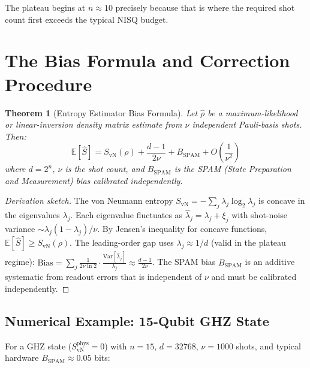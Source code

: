 \documentclass[12pt,letterpaper]{article}
\theoremstyle{plain}
\newtheorem{theorem}{Theorem}[section]
\theoremstyle{definition}
\theoremstyle{remark}
\newcommand{\SvN}{S_{\mathrm{vN}}}
\newcommand{\Shat}{\hat{S}}
\newcommand{\bias}{B_{\mathrm{SPAM}}}
\begin{document}
The plateau begins at $n \approx 10$ precisely because that is where the
required shot count first exceeds the typical NISQ budget.

\section{The Bias Formula and Correction Procedure}
\label{sec:bias}

\begin{theorem}[Entropy Estimator Bias Formula]
\label{thm:bias}
Let $\hat\rho$ be a maximum-likelihood or linear-inversion density matrix
estimate from $\nu$ independent Pauli-basis shots. Then:
\begin{equation}
  \mathbb{E}[\Shat] = \SvN(\rho)
  + \frac{d-1}{2\nu}
  + \bias
  + O\!\left(\frac{1}{\nu^2}\right)
  \tag{B3.1}
  \label{eq:bias_formula}
\end{equation}
where $d = 2^n$, $\nu$ is the shot count, and $\bias$ is the
SPAM (State Preparation and Measurement) bias calibrated independently.
\end{theorem}

\begin{proof}[Derivation sketch]
The von Neumann entropy $\SvN = -\sum_j\lambda_j\log_2\lambda_j$ is
concave in the eigenvalues $\lambda_j$. Each eigenvalue fluctuates as
$\hat\lambda_j = \lambda_j + \xi_j$ with shot-noise variance
$\sim\lambda_j(1-\lambda_j)/\nu$. By Jensen's inequality for concave
functions, $\mathbb{E}[\Shat] \geq \SvN(\rho)$. The leading-order gap
uses $\lambda_j \approx 1/d$ (valid in the plateau regime):
$\mathrm{Bias} = \sum_j\frac{1}{2\nu\ln 2}\cdot
\frac{\mathrm{Var}[\hat\lambda_j]}{\lambda_j}
\approx \frac{d-1}{2\nu}$.
The SPAM bias $\bias$ is an additive systematic from readout errors that
is independent of $\nu$ and must be calibrated independently.
\end{proof}

\subsection{Numerical Example: 15-Qubit GHZ State}

For a GHZ state ($\SvN^{\mathrm{phys}} = 0$) with $n=15$, $d=32768$,
$\nu=1000$ shots, and typical hardware $\bias \approx 0.05$ bits:
\end{document}
